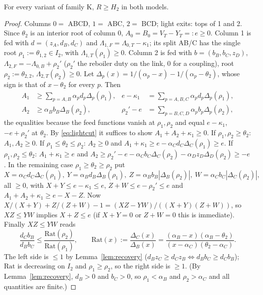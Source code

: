 \documentclass[11pt,a4paper]{report}
\newcommand{\Lam}{\Lambda}
\begin{document}
\begin{lemma}[family K]\label{lem:K}
For every variant of family K, $R\ge H_2$ in both models.
\end{lemma}
\begin{proof}
Columns $0=$ ABCD, $1=$ ABC, $2=$ BCD; light exits: tops of 1 and 2. Since $\theta_2$ is an interior root of column 0,
$A_0=B_0=V_T-Y_T=:e\ge0$. Column 1 is fed with $d=(z_A,d_B,d_C)$ and $\Lam_{1,F}=\Lam_{0,T}-\kappa_1$; its split AB/C has the
single root $\rho_1:=\theta_{1,2}\in I_2$, with $\Lam_{1,T}(\rho_1)\ge0$. Column 2 is fed with $b=(b_B,b_C,z_D)$,
$\Lam_{2,F}=-\Lam_{0,B}+\rho_2'$ ($\rho_2'$ the reboiler duty on the link, $0$ for a coupling), root
$\rho_2:=\theta_{2,2}$, $\Lam_{2,T}(\rho_2)\ge0$. Let $\Delta_p(x)=1/(\alpha_p-x)-1/(\alpha_p-\theta_2)$, whose sign is that of
$x-\theta_2$ for every $p$. Then
\[\begin{aligned}
A_1&\ge\sum_{p=A,B}\alpha_pd_p\Delta_p(\rho_1), & e-\kappa_1&=\sum_{p=A,B,C}\alpha_pd_p\Delta_p(\rho_1),\\
A_2&\ge\alpha_Bb_B\Delta_B(\rho_2), & \rho_2'-e&=\sum_{p=B,C,D}\alpha_pb_p\Delta_p(\rho_2),
\end{aligned}\]
the equalities because the feed functions vanish at $\rho_1,\rho_2$ and equal $e-\kappa_1$, $-e+\rho_2'$ at $\theta_2$. By
\eqref{eq:lightcut} it suffices to show $A_1+A_2+\kappa_1\ge0$. If $\rho_1,\rho_2\ge\theta_2$: $A_1,A_2\ge0$. If
$\rho_1\le\theta_2\le\rho_2$: $A_2\ge0$ and $A_1+\kappa_1\ge e-\alpha_Cd_C\Delta_C(\rho_1)\ge e$. If $\rho_1,\rho_2\le\theta_2$:
$A_1+\kappa_1\ge e$ and $A_2\ge\rho_2'-e-\alpha_Cb_C\Delta_C(\rho_2)-\alpha_Dz_D\Delta_D(\rho_2)\ge-e$. In the remaining case
$\rho_1\ge\theta_2\ge\rho_2$ put
\[X=\alpha_Cd_C\Delta_C(\rho_1),\ Y=\alpha_Bd_B\Delta_B(\rho_1),\ Z=\alpha_Bb_B|\Delta_B(\rho_2)|,\ W=\alpha_Cb_C|\Delta_C(\rho_2)|,\]
all $\ge0$, with $X+Y\le e-\kappa_1\le e$, $Z+W\le e-\rho_2'\le e$ and $A_1+A_2+\kappa_1\ge e-X-Z$. Now
$X/(X+Y)+Z/(Z+W)-1=(XZ-YW)/((X+Y)(Z+W))$, so $XZ\le YW$ implies $X+Z\le e$ (if $X+Y=0$ or $Z+W=0$ this is immediate).
Finally $XZ\le YW$ reads
\[\frac{d_Cb_B}{d_Bb_C}\le\frac{\mathrm{Rat}(\rho_2)}{\mathrm{Rat}(\rho_1)},\qquad
\mathrm{Rat}(x):=\frac{\Delta_C(x)}{\Delta_B(x)}=\frac{(\alpha_B-x)(\alpha_B-\theta_2)}{(x-\alpha_C)(\theta_2-\alpha_C)} .\]
The left side is $\le1$ by Lemma~\ref{lem:recovery} ($d_Bz_C\ge d_Cz_B\iff d_Bb_C\ge d_Cb_B$); $\mathrm{Rat}$ is decreasing on
$I_2$ and $\rho_1\ge\rho_2$, so the right side is $\ge1$. (By Lemma~\ref{lem:recovery}, $d_B>0$ and $b_C>0$, so $\rho_1<\alpha_B$
and $\rho_2>\alpha_C$ and all quantities are finite.)
\end{proof}
\end{document}
